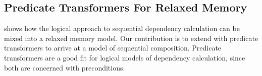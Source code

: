 \subsection{Predicate Transformers For Relaxed Memory}

\PwP{} shows how the logical approach to sequential dependency calculation
can be mixed into a relaxed memory model.  Our contribution is to extend
\PwP{} with predicate transformers to arrive at a model of sequential
composition.  Predicate transformers are a good fit for logical models of
dependency calculation, since both are concerned with
preconditions.%




%   

